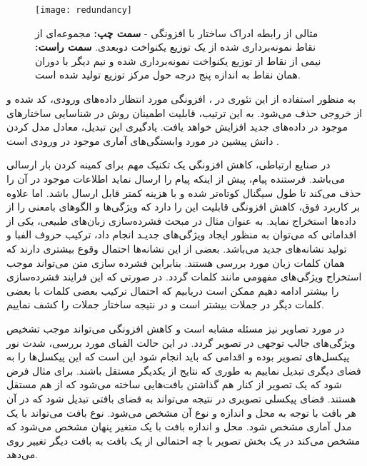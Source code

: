 \begin{figure}[t]
	\begin{center}
		\texttt{[image: redundancy]}
	\end{center}
\caption[مثالی از رابطه ادراک ساختار با افزونگی]
{
مثالی از رابطه ادراک ساختار با افزونگی -
\textbf{سمت چپ:}
مجموعه‌ای از نقاط نمونه‌برداری شده از یک توزیع یکنواخت دوبعدی.
\textbf{سمت راست:}
نیمی از نقاط از توزیع یکنواخت نمونه‌برداری شده و نیم دیگر با دوران همان نقاط به اندازه پنج درجه حول مرکز توزیع تولید شده است.
\label{fig.redundancy}
}
\end{figure}

به منظور استفاده از این تئوری در
{}،
افزونگی مورد انتظار داده‌های ورودی، کد شده و از خروجی حذف می‌شود.
به این ترتیب، قابلیت اطمینان روش در شناسایی ساختارهای موجود در داده‌های جدید افزایش خواهد یافت.
یادگیری این تبدیل، معادل مدل کردن دانش پیشین در مورد وابستگی‌های آماری موجود در ورودی است%
\cite{barlow_possible_1961}.

در صنایع ارتباطی، کاهش افزونگی یک تکنیک مهم برای کمینه کردن بار ارسالی می‌باشد.
فرستنده پیام، پیش از اینکه پیام را ارسال نماید اطلاعات
{}
موجود در آن را حذف می‌کند تا طول سیگنال کوتاه‌تر شده و با هزینه کمتر قابل ارسال باشد.
اما علاوه بر کاربرد فوق، کاهش افزونگی قابلیت این را دارد که ویژگی‌ها و الگو‌های بامعنی را از داده‌ها استخراج نماید.
به عنوان مثال در مبحث فشرده‌سازی زبان‌های طبیعی، یکی از اقداماتی که می‌توان به منظور ایجاد ویژگی‌های جدیـد انجام داد، ترکیب حروف الفبا و تولید نشانه‌های جدید می‌باشد.
بعضی از این نشانه‌ها احتمال وقوع بیشتری دارند که همان کلمات زبان مورد بررسی هستند.
بنابراین فشرده سازی متن می‌تواند موجب استخراج ویژگی‌های مفهومی مانند کلمات گردد.
در صورتی که این فرایند فشرده‌سازی را بیشتر ادامه دهیم ممکن است دریابیم که احتمال ترکیب بعضی کلمات با بعضی کلمات دیگر در جملات بیشتر است و در نتیجه ساختار جملات را کشف نماییم.

در مورد تصاویر نیز مسئله مشابه است و کاهش افزونگی می‌تواند موجب تشخیص ویژگی‌های جالب توجهی در تصویر گردد.
در این حالت الفبای مورد بررسی، شدت نور پیکسل‌های تصویر بوده و اقدامی که باید انجام شود این است که این پیکسل‌ها را به فضای دیگری تبدیل نماییم به طوری که نتایج از یکدیگر مستقل باشند.
برای مثال فرض شود که یک تصویر از کنار هم گذاشتن بافت‌هایی ساخته می‌شود که از هم مستقل هستند.
فضای پیکسلی تصویری در نتیجه می‌تواند به فضای بافتی تبدیل شود که در آن هر بافت با توجه به محل و اندازه و نوع آن مشخص می‌شود.
نوع بافت می‌تواند با یک مدل آماری مشخص شود.
محل و اندازه بافت با یک متغیر پنهان مشخص می‌شود که  مشخص می‌کند در یک بخش تصویر با چه احتمالی از یک بافت به بافت دیگر تغییر روی می‌دهد.

